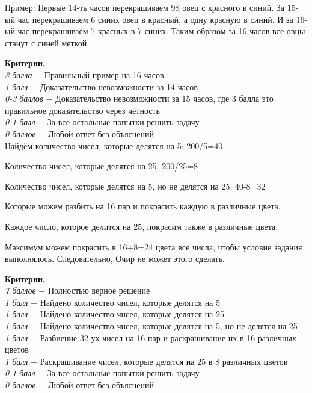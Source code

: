 Пример: Первые 14-ть часов перекрашиваем 98 овец с красного в синий. За 15-ый час перекрашиваем 6 синих овец в красный, а одну красную в синий. И за 16-ый час перекрашиваем 7 красных в 7 синих. Таким образом за 16 часов все овцы станут с синей меткой.\par

\textbf{Критерии.} \\
\textit{3 балла} $-$ Правильный пример на 16 часов\\
\textit{1 балл} $-$ Доказательство невозможности за 14 часов\\
\textit{0-3 баллов} $-$ Доказательство невозможности за 15 часов, где 3 балла это правильное доказательство через чётность\\
\textit{0-1 балл} $-$  За все остальные попытки решить задачу\\ 
\textit{0 баллов} $-$ Любой ответ без объяснений\\


 Найдём количество чисел, которые делятся на 5: 200/5=40

Количество чисел, которые делятся на 25: 200/25=8

Количество чисел, которые делятся на 5, но не делятся на 25: 40-8=32

Которые можем разбить на 16 пар и покрасить каждую в различные цвета.

Каждое число, которое делится на 25, покрасим также в различные цвета.

Максимум можем покрасить в 16+8=24 цвета все числа, чтобы условие задания выполнялось. Следовательно, Очир не может этого сделать.\par

\textbf{Критерии.} \\
\textit{7 баллов} $-$ Полностью верное решение\\
\textit{1 балл} $-$ Найдено количество чисел, которые делятся на 5\\
\textit{1 балл} $-$ Найдено количество чисел, которые делятся на 25\\
\textit{1 балл} $-$ Найдено количество чисел, которые делятся на 5, но не делятся на 25\\ 
\textit{1 балл} $-$ Разбиение 32-ух чисел на 16 пар и раскрашивание их в 16 различных цветов\\
\textit{1 балл} $-$ Раскрашивание чисел, которые делятся на 25 в 8 различных цветов\\
\textit{0-1 балл} $-$ За все остальные попытки решить задачу\\
\textit{0 баллов} $-$ Любой ответ без объяснений\\